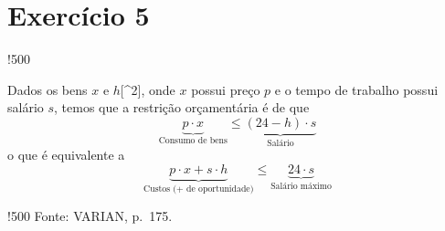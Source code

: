 \documentclass[12pt]{article}
\numberwithin{equation}{section}
\theoremstyle{plain}
\theoremstyle{definition}
\theoremstyle{remark}
\begin{document}
\hypertarget{exercuxedcio-5}{%
\section{Exercício 5}\label{exercuxedcio-5}}

!500

Dados os bens \(x\) e \(h\){[}\^{}2{]}, onde \(x\) possui preço \(p\) e
o tempo de trabalho possui salário \(s\), temos que a restrição
orçamentária é de que \[
\underbrace{ p\cdot x }_{ \text{Consumo de bens} } \leq \underbrace{ (24-h)\cdot s }_{ \text{Salário} }
\] o que é equivalente a \[
\underbrace{ p \cdot x + s \cdot h }_{ \text{Custos (+ de oportunidade)} } \leq \underbrace{ 24 \cdot s }_{ \text{Salário máximo} }
\]

!500 Fonte: VARIAN, p.~175.

\printbibliography
\end{document}
